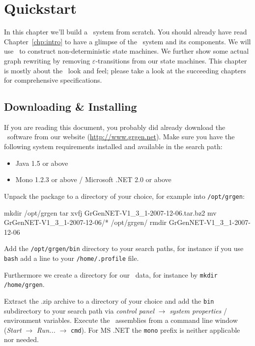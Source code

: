 \chapter{Quickstart}

In this chapter we'll build a \GrG\ system from scratch. 
You should already have read Chapter~\ref{chp:intro} to have a glimpse of the \GrG\ system and its components.
We will use \GrG\ to construct non-deterministic state machines.
We further show some actual graph rewriting by removing $\varepsilon$-transitions from our state machines.
This chapter is mostly about the \GrG\ look and feel; please take a look at the succeeding chapters for comprehensive specifications.

\section{Downloading \& Installing}
If you are reading this document, you probably did already download the \GrG\ software from our website (\url{http://www.grgen.net}).
Make sure you have the following system requirements installed and available in the search path:
\begin{itemize}
	\item Java 1.5 or above
	\item Mono 1.2.3 or above / Microsoft .NET 2.0 or above 
\end{itemize}

Unpack the package to a directory of your choice, for example into \texttt{/opt/grgen}:
\begin{bash}
mkdir /opt/grgen
tar xvfj GrGenNET-V1_3_1-2007-12-06.tar.bz2
mv GrGenNET-V1_3_1-2007-12-06/* /opt/grgen/
rmdir GrGenNET-V1_3_1-2007-12-06
\end{bash}
Add the \texttt{/opt/grgen/bin} directory to your search paths, for instance if you use \texttt{bash} add a line to your \texttt{/home/.profile} file.
Furthermore we create a directory for our \GrG\ data, for instance by \texttt{mkdir /home/grgen}.

\vspace{2mm}
Extract the .zip archive to a directory of your choice and add the \texttt{bin} subdirectory to your search path via \emph{control panel} $\rightarrow$ \emph{system properties} / environment variables.
Execute the \GrG\ assemblies from a command line window (\emph{Start} $\rightarrow$ \emph{Run...} $\rightarrow$ \texttt{cmd}).
For MS .NET the \texttt{mono} prefix is neither applicable nor needed.

